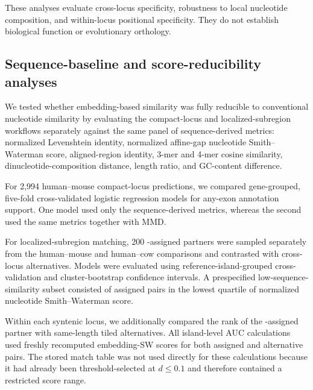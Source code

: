 These analyses evaluate cross-locus specificity, robustness to local nucleotide
composition, and within-locus positional specificity. They do not establish
biological function or evolutionary orthology.

\subsection{Sequence-baseline and score-reducibility analyses}
\label{sec:sequence-baselines}

We tested whether embedding-based similarity was fully reducible to conventional
nucleotide similarity by evaluating the compact-locus and localized-subregion
workflows separately against the same panel of sequence-derived metrics:
normalized Levenshtein identity, normalized affine-gap nucleotide
Smith--Waterman score, aligned-region identity, 3-mer and 4-mer cosine
similarity, dinucleotide-composition distance, length ratio, and GC-content
difference.

For 2{,}994 human--mouse compact-locus predictions, we compared gene-grouped,
five-fold cross-validated logistic regression models for any-exon annotation
support. One model used only the sequence-derived metrics, whereas the second
used the same metrics together with MMD.

For localized-subregion matching, 200 \curia{}-assigned partners were sampled
separately from the human--mouse and human--cow comparisons and contrasted with
cross-locus alternatives. Models were evaluated using
reference-island-grouped cross-validation and cluster-bootstrap confidence
intervals. A prespecified low-sequence-similarity subset consisted of assigned
pairs in the lowest quartile of normalized nucleotide Smith--Waterman score.

Within each syntenic locus, we additionally compared the rank of the
\curia{}-assigned partner with same-length tiled alternatives. All island-level
AUC calculations used freshly recomputed embedding-SW scores for both assigned
and alternative pairs. The stored match table was not used directly for these
calculations because it had already been threshold-selected at $d \leq 0.1$ and
therefore contained a restricted score range.

